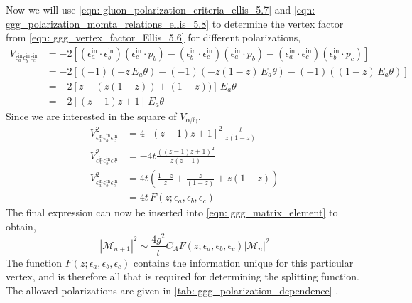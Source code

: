 \documentclass[main.tex]{subfiles}
\begin{document}
Now we will use \autoref{eqn: gluon_polarization_criteria_ellis_5.7} and \autoref{eqn: ggg_polarization_momta_relations_ellis_5.8} to determine the vertex factor from \autoref{eqn: ggg_vertex_factor_Ellis_5.6} for different polarizations, 
\begin{align}
    V_{\epsilon_a^\text{in} \epsilon_b^\text{in} \epsilon_c^\text{in}} &= -2 \left[
    (\epsilon_a^\text{in} \cdot \epsilon_b^\text{in})(\epsilon_c^\text{in} \cdot p_b) - 
    (\epsilon_b^\text{in} \cdot \epsilon_c^\text{in})(\epsilon_a^\text{in} \cdot p_b) -
    (\epsilon_a^\text{in} \cdot \epsilon_c^\text{in})(\epsilon_b^\text{in} \cdot p_c)
    \right] \nonumber\\
    &= -2 \left[
    (-1)(-z\,E_a\theta) - (-1)(-z(1-z)\,E_a\theta) - (-1)((1-z)\, E_a\theta) 
    \right] \nonumber \\
    &= -2 \left[ z - (z(1-z)) + (1-z) ) \right] \,E_a\theta \nonumber \\
    &= -2 \left[ (z-1)z+ 1 \right] \,E_a\theta
\end{align}
Since we are interested in the square of \(V_{\alpha\beta\gamma}\),
\begin{align}
    V_{\epsilon_a^\text{in} \epsilon_b^\text{in} \epsilon_c^\text{in}}^2 &= 4 \left[ (z-1)z+ 1
    \right]^2 \,\frac{t}{z(1-z)} \nonumber\\
    V_{\epsilon_a^\text{in} \epsilon_b^\text{in} \epsilon_c^\text{in}}^2 &= -4 t 
    \frac{((z-1)z+ 1)^2}{z(z-1)} \nonumber \\
    V_{\epsilon_a^\text{in} \epsilon_b^\text{in} \epsilon_c^\text{in}}^2 &= 4 t 
    \left( \frac{1-z}{z} + \frac{z}{(1-z)} + z(1-z) \right) \nonumber \\
    &= 4t \, F(z;\epsilon_a,\epsilon_b,\epsilon_c)
\end{align}
The final expression can now be inserted into \autoref{eqn: ggg_matrix_element} to obtain, 
\begin{equation}\label{eqn: ggg_matrix_element_ellis_5.9}
    |\mathcal{M}_{n+1}|^2 \sim \frac{4g^2}{t} C_A F(z;\epsilon_a,\epsilon_b,\epsilon_c) |\mathcal{M}_n|^2
\end{equation}
The function \(F(z;\epsilon_a,\epsilon_b,\epsilon_c)\) contains the information unique for this particular vertex, and is therefore all that is required for determining the splitting function. The allowed polarizations are given in \autoref{tab: ggg_polarization_dependence} \cite{ellis_stirling_webber_1996}.
\end{document}
